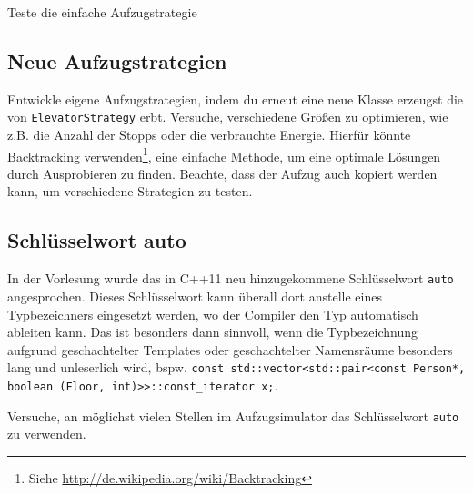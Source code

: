 \begin{algorithm}[H]
 \SetAlgoLined
\end{algorithm}

Teste die einfache Aufzugstrategie

\subsection{Neue Aufzugstrategien \optional}
\optionaltextbox
Entwickle eigene Aufzugstrategien, indem du erneut eine neue Klasse erzeugst die von \lstinline{ElevatorStrategy} erbt.
Versuche, verschiedene Größen zu optimieren, wie z.B. die Anzahl der Stopps oder die verbrauchte Energie.
Hierfür könnte Backtracking verwenden\footnote{Siehe \url{http://de.wikipedia.org/wiki/Backtracking}}, eine einfache Methode, um eine optimale Lösungen durch Ausprobieren zu finden.
Beachte, dass der Aufzug auch kopiert werden kann, um verschiedene Strategien zu testen.

\subsection{Schlüsselwort auto \optional}
\optionaltextbox
In der Vorlesung wurde das in C++11 neu hinzugekommene Schlüsselwort \lstinline{auto} angesprochen.
Dieses Schlüsselwort kann überall dort anstelle eines Typbezeichners eingesetzt werden, wo der Compiler den Typ automatisch ableiten kann.
Das ist besonders dann sinnvoll, wenn die Typbezeichnung aufgrund geschachtelter Templates oder geschachtelter Namensräume besonders lang und unleserlich wird, bspw. \lstinline{const std::vector<std::pair<const Person*, boolean (Floor, int)>>::const_iterator x;}.

Versuche, an möglichst vielen Stellen im Aufzugsimulator das Schlüsselwort \lstinline{auto} zu verwenden.
